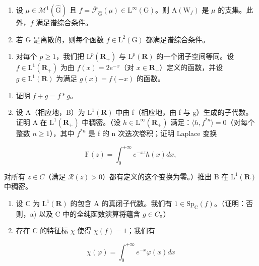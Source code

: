 \begin{enumerate}
\def\labelenumi{\alph{enumi})}
\item
  设 \(\mu \in \mathcal{M}^1 (\widehat{\mathrm{G}})\) 且 \(f = \overline{\mathcal{F}}_{\widehat{\mathrm{G}}}(\mu)\in \mathrm{L}^{\infty}(\mathrm{G})\)。则 \(\mathrm{A}(\mathrm{W}_f)\) 是 \(\mu\) 的支集。此外，\(f\) 满足谱综合条件。
\item
  若 G 是离散的，则每个函数 \(f \in \mathrm{L}^{2}(\mathrm{G})\) 都满足谱综合条件。
\end{enumerate}

\begin{enumerate}
\def\labelenumi{\arabic{enumi})}
\setcounter{enumi}{16}
\tightlist
\item
  对每个 \(p \geqslant 1\)，我们把 \(\mathrm{L}^p(\mathbf{R}_+)\) 与 \(\mathrm{L}^p(\mathbf{R})\) 的一个闭子空间等同。设 \(f \in \mathrm{L}^1(\mathbf{R}_+)\) 为由 \(f(x) = 2e^{-x}\)（对 \(x \in \mathbf{R}_+\)）定义的函数，并设 \(g \in \mathrm{L}^1(\mathbf{R})\) 为满足 \(g(x) = f(-x)\) 的函数。
\end{enumerate}

\begin{enumerate}
\def\labelenumi{\alph{enumi})}
\item
  证明 \(f + g = f * g\)。
\item
  设 A（相应地，B）为 \(\mathrm{L}^{1}(\mathbf{R})\) 中由 f（相应地，由 f 与 g）生成的子代数。证明 A 在 \(\mathrm{L}^{1}(\mathbf{R}_{+})\) 中稠密。（设 \(h \in \mathrm{L}^{\infty}(\mathbf{R}_{+})\) 满足：\(\langle h, f^{*n} \rangle = 0\)（对每个整数 \(n \geqslant 1\)），其中 \(f^{*n}\) 是 f 的 n 次迭次卷积；证明 Laplace 变换
\end{enumerate}

\[
\mathrm{F} (z) = \int_ {0} ^ {+ \infty} e ^ {- x z} h (x) d x,
\]

对所有 \(z \in C\)（满足 \(\mathcal{R}(z) > 0\)）都有定义的这个变换为零。）推出 B 在 \(\mathrm{L}^{1}(\mathbf{R})\) 中稠密。

\begin{enumerate}
\def\labelenumi{\alph{enumi})}
\setcounter{enumi}{2}
\item
  设 C 为 \(\mathrm{L}^{1}(\mathbf{R})\) 的包含 A 的真闭子代数。我们有 \(1 \in \mathrm{Sp}_{\mathrm{C}}(f)\)。（证明：否则，a) 以及 C 中的全纯函数演算将蕴含 \(g \in C\)。）
\item
  存在 C 的特征标 \(\chi\) 使得 \(\chi(f)=1\)；我们有
\end{enumerate}

\[
\chi (\varphi) = \int_ {0} ^ {+ \infty} e ^ {- x} \varphi (x) d x
\]

